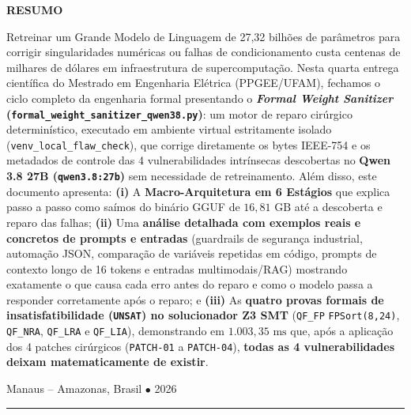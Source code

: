 \documentclass[11pt,a4paper]{article}
\theoremstyle{definition}
\begin{document}
\begin{titlepage}
    \vspace{0.55cm}
    \begin{minipage}{0.98\textwidth}
        \footnotesize
        \begin{center}\textbf{RESUMO}\end{center}
        \noindent Retreinar um Grande Modelo de Linguagem de 27,32 bilhões de parâmetros para corrigir singularidades numéricas ou falhas de condicionamento custa centenas de milhares de dólares em infraestrutura de supercomputação. Nesta quarta entrega científica do Mestrado em Engenharia Elétrica (PPGEE/UFAM), fechamos o ciclo completo da engenharia formal presentando o \textbf{\textit{Formal Weight Sanitizer} (\texttt{formal\_weight\_sanitizer\_qwen38.py})}: um motor de reparo cirúrgico determinístico, executado em ambiente virtual estritamente isolado (\texttt{venv\_local\_flaw\_check}), que corrige diretamente os bytes IEEE-754 e os metadados de controle das 4 vulnerabilidades intrínsecas descobertas no \textbf{Qwen 3.8 27B (\texttt{qwen3.8:27b})} sem necessidade de retreinamento. Além disso, este documento apresenta: \textbf{(i)} A \textbf{Macro-Arquitetura em 6 Estágios} que explica passo a passo como saímos do binário GGUF de $16{,}81\text{ GB}$ até a descoberta e reparo das falhas; \textbf{(ii)} Uma \textbf{análise detalhada com exemplos reais e concretos de prompts e entradas} (guardrails de segurança industrial, automação JSON, comparação de variáveis repetidas em código, prompts de contexto longo de 16 tokens e entradas multimodais/RAG) mostrando exatamente o que causa cada erro antes do reparo e como o modelo passa a responder corretamente após o reparo; e \textbf{(iii)} As \textbf{quatro provas formais de insatisfatibilidade (\texttt{UNSAT}) no solucionador Z3 SMT} (\texttt{QF\_FP} \texttt{FPSort(8,24)}, \texttt{QF\_NRA}, \texttt{QF\_LRA} e \texttt{QF\_LIA}), demonstrando em $1.003{,}35\text{ ms}$ que, após a aplicação dos 4 patches cirúrgicos (\texttt{PATCH-01} a \texttt{PATCH-04}), \textbf{todas as 4 vulnerabilidades deixam matematicamente de existir}.
    \end{minipage}
    
    \vfill
    {\small Manaus -- Amazonas, Brasil $\bullet$ 2026 \par}
\end{titlepage}

\newpage
\tableofcontents
\vspace{0.4cm}
\hrule
\vspace{0.4cm}

\end{document}
